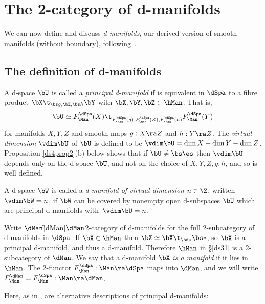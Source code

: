 \documentclass{article}
\begin{document}
\section{The 2-category of d-manifolds}
\label{ds4}

We can now define and discuss {\it d-manifolds}, our derived version
of smooth manifolds (without boundary), following~\cite[Chap.s 3 \&
4]{Joyc6}.

\subsection{The definition of d-manifolds}
\label{ds41}

\begin{dfn} A d-space $\bU$ is called a {\it principal
d-manifold\/} if is equivalent in $\dSpa$ to a fibre product
$\bX\t_{\bs g,\bZ,\bs h}\bY$ with $\bX,\bY,\bZ\in\hMan$. That is,
\begin{equation*}
\bU\simeq F_\Man^\dSpa(X)\t_{F_\Man^\dSpa(g),F_\Man^\dSpa(Z),
F_\Man^\dSpa(h)}F_\Man^\dSpa(Y)
\end{equation*}
for manifolds $X,Y,Z$ and smooth maps $g:X\ra Z$ and $h:Y\ra Z$. The
{\it virtual dimension\/} $\vdim\bU$ of $\bU$ is defined to be
$\vdim\bU=\dim X+\dim Y-\dim Z$. Proposition \ref{ds4prop2}(b) below
shows that if $\bU\ne\bs\es$ then $\vdim\bU$ depends only on the
d-space $\bU$, and not on the choice of $X,Y,Z,g,h$, and so is well
defined.

A d-space $\bW$ is called a {\it d-manifold of virtual dimension\/}
$n\in\Z$, written $\vdim\bW=n$, if $\bW$ can be covered by nonempty
open d-subspaces $\bU$ which are principal d-manifolds
with~$\vdim\bU=n$.

Write $\dMan$\G[dMan]{$\dMan$}{2-category of d-manifolds} for the
full 2-subcategory of d-manifolds in $\dSpa$. If $\bX\in\hMan$ then
$\bX\simeq\bX\t_{\bs *}\bs *$, so $\bX$ is a principal d-manifold,
and thus a d-manifold. Therefore $\hMan$ in \S\ref{ds31} is a
2-subcategory of $\dMan$. We say that a d-manifold $\bX$ {\it is a
manifold\/} if it lies in $\hMan$. The
2-functor $F_\Man^\dSpa:\Man\ra\dSpa$ maps into $\dMan$, and we will
write $F_\Man^\dMan=F_\Man^\dSpa:\Man\ra\dMan$.
\label{ds4def1}
\end{dfn}

Here, as in \cite[\S 3.2]{Joyc6}, are alternative descriptions of
principal d-manifolds:
\end{document}

